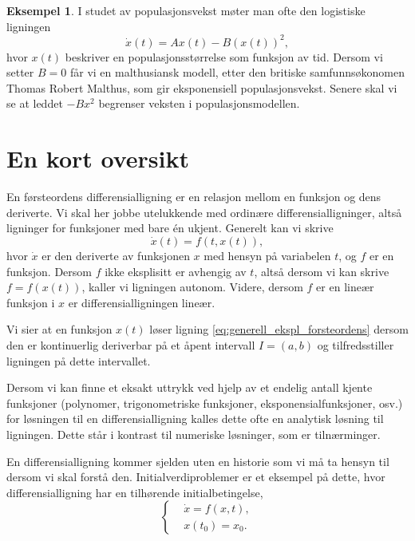 \documentclass{article}
\theoremstyle{plain}
\theoremstyle{definition}
\newtheorem{eksempel}[teorem]{Eksempel}
\theoremstyle{remark}
\newcommand{\fcn}{x}
\begin{document}
\begin{eksempel} \label{eks:populasjon_1}
    I studet av populasjonsvekst møter man ofte den logistiske ligningen
    \begin{equation*}
        \dot{x}(t) = A \fcn(t) - B (\fcn(t))^2,
    \end{equation*}
    hvor $\fcn(t)$ beskriver en populasjonsstørrelse som funksjon av tid. Dersom vi setter $B = 0$ får vi en malthusiansk modell, etter den britiske samfunnsøkonomen Thomas Robert Malthus, som gir eksponensiell populasjonsvekst. Senere skal vi se at leddet $-B x^2$ begrenser veksten i populasjonsmodellen.
\end{eksempel}


\section*{En kort oversikt}

En førsteordens differensialligning er en relasjon mellom en funksjon og dens deriverte. Vi skal her jobbe utelukkende med ordinære differensialligninger, altså ligninger for funksjoner med bare én ukjent. Generelt kan vi skrive
\begin{equation} \label{eq:generell_ekspl_forsteordens}
    \dot{\fcn}(t) = f(t, \fcn(t)),
\end{equation}
hvor $\dot{\fcn}$ er den deriverte av funksjonen $\fcn$ med hensyn på variabelen $t$, og $f$ er en funksjon. Dersom $f$ ikke eksplisitt er avhengig av $t$, altså dersom vi kan skrive $f = f(\fcn(t))$, kaller vi ligningen autonom. Videre, dersom $f$ er en lineær funksjon i $\fcn$ er differensialligningen lineær.

Vi sier at en funksjon $\fcn(t)$ løser ligning \eqref{eq:generell_ekspl_forsteordens} dersom den er kontinuerlig deriverbar på et åpent intervall $I = (a, b)$ og tilfredsstiller ligningen på dette intervallet. 

Dersom vi kan finne et eksakt uttrykk ved hjelp av et endelig antall kjente funksjoner (polynomer, trigonometriske funksjoner, eksponensialfunksjoner, osv.) for løsningen til en differensialligning kalles dette ofte en analytisk løsning til ligningen. Dette står i kontrast til numeriske løsninger, som er tilnærminger.

En differensialligning kommer sjelden uten en historie som vi må ta hensyn til dersom vi skal forstå den. Initialverdiproblemer er et eksempel på dette, hvor differensialligning har en tilhørende initialbetingelse,
\begin{equation} \label{eq:ivp}
    \left\{
        \begin{aligned}
            & \dot{x} = f(\fcn, t), \\
            & x(t_0) = x_0.
        \end{aligned}
    \right.
\end{equation}
\end{document}
